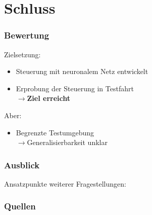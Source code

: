 \documentclass{beamer}
\begin{document}
\section{Schluss}
\frame{\tableofcontents[currentsection]}

\begin{frame}
\frametitle{Bewertung}
Zielsetzung:\\
\begin{itemize}
\item{Steuerung mit neuronalem Netz entwickelt}
\item{Erprobung der Steuerung in Testfahrt}\\
$\xrightarrow{}$\textbf{Ziel erreicht}\\
\end{itemize}
\pause
Aber:\\
\begin{itemize}
\item{Begrenzte Testumgebung}\\
$\xrightarrow{}$Generalisierbarkeit unklar
\end{itemize}
\end{frame}

\begin{frame}
\frametitle{Ausblick}
Ansatzpunkte weiterer Fragestellungen:

\end{frame}

\begin{frame}
\frametitle{Quellen}


\end{frame}
\end{document}
